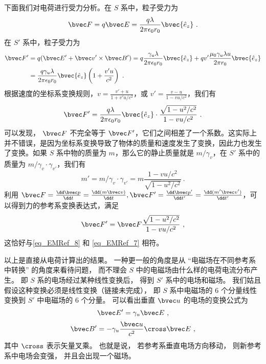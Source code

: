 下面我们对电荷进行受力分析。在 $S$ 系中，粒子受力为
\begin{equation}\label{eq_EMRef_8}
\bvec F=q\bvec E=\frac{q\lambda}{2\pi\epsilon_0 r_0} \bvec {\hat e_z}~.
\end{equation}
在 $S'$ 系中，粒子受力为
\begin{equation}
\begin{aligned}
\bvec F'&=q(\bvec E'+\bvec v'\times \bvec B')= q\frac{\gamma_u\lambda}{2\pi\epsilon_0 r_0} \bvec {\hat e_z}+qv'\frac{\mu_0\gamma_u \lambda u}{2\pi r_0} \bvec {\hat e_z}
\\
&=\frac{q\gamma_u\lambda}{2\pi\epsilon_0r_0}\bvec {\hat e_z}\left(1+\frac{v' u}{c^2}\right)~.
\end{aligned}
\end{equation}
根据速度的坐标系变换规则，$v=\frac{v'+u}{1+v'u/c^2}$，或 $v'=\frac{v-u}{1-vu/c^2}$，我们有
\begin{equation}\label{eq_EMRef_7}
\bvec F'=\frac{q\lambda}{2\pi\epsilon_0r_0}\bvec {\hat e_z} \cdot\frac{\sqrt{1-u^2/c^2}}{1-vu/c^2}~.
\end{equation}
可以发现， $\bvec F$ 不完全等于 $\bvec F'$，它们之间相差了一个系数。这实际上并不错误，是因为坐标系变换导致了物体的质量和速度发生了变换，因此力也发生了变换。如果 $S$ 系中物的质量为 $m$，那么它的静止质量就是 $m/\gamma_v$，在 $S'$ 系中的质量为 $m/\gamma_v \cdot \gamma_{v'}$，我们有
\begin{equation}
m'=m/\gamma_v\cdot \gamma_{v'}=m \frac{1-vu/c^2}{\sqrt{1-u^2/c^2}}~.
\end{equation}
利用 $\bvec F=\frac{\dd \bvec p}{\dd t}=\frac{\dd (m \bvec v)}{\dd t},\bvec F'=\frac{\dd \bvec p'}{\dd t'}=\frac{\dd (m'\bvec v')}{\dd t'}$，可以得到力的参考系变换表达式，满足
\begin{equation}
\bvec F'=\bvec F\frac{\sqrt{1-u^2/c^2}}{1-vu/c^2}~,
\end{equation}
这恰好与\autoref{eq_EMRef_8} 和 \autoref{eq_EMRef_7} 相符。


以上是直接从电荷计算出的结果。 一种更一般的角度是从 “电磁场在不同参考系中转换” 的角度来看待问题， 而不理会 $S$ 中的电磁场由什么样的电荷电流分布产生。 即 $S$ 系的电场经过某种线性变换后， 得到 $S'$ 系中的电场和磁场。 我们姑且假设这种变换必须是线性变换（链接未完成）， 即 $S$ 系中电磁场的 6 个分量线性变换到 $S'$ 中电磁场的 6 个分量。 可以看出垂直 $\bvec u$ 的电场的变换公式为
\begin{equation}\label{eq_EMRef_5}
\bvec E' = \gamma_u \bvec E~,
\end{equation}
\begin{equation}\label{eq_EMRef_6}
\bvec B' = -\gamma_u \frac{\bvec u}{c^2} \cross \bvec E~,
\end{equation}
其中 $\cross$ 表示矢量叉乘。 也就是说， 若参考系垂直电场方向移动， 则新参考系中电场会变强， 并且会出现一个磁场。

